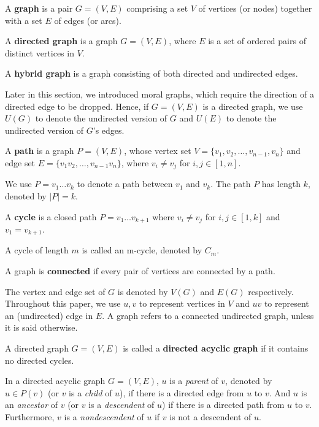 \begin{definition}
\label{def:graph}
A \textbf{graph} is a pair $G = (V, E)$ comprising a set $V$ of vertices (or nodes) together with a set $E$ of edges (or arcs).
\end{definition}

\begin{definition}
\label{def:digraph}
A \textbf{directed graph} is a graph $G=(V,E)$, where $E$ is a set of ordered pairs of distinct vertices in $V$.
\end{definition} 

\begin{definition}
\label{def:hybrid_g}
A \textbf{hybrid graph} is a graph consisting of both directed and undirected edges. 
\end{definition}
Later in this section, we introduced moral graphs, which require the direction of a directed edge to be dropped. Hence, if $G=(V,E)$ is a directed graph, we use $U(G)$ to denote the undirected version of $G$ and $U(E)$ to denote the undirected version of $G$'s edges. 

\begin{definition}
A \textbf{path} is a graph $P=(V,E)$, whose vertex set $V=\{v_1,v_2,\dots,v_{n-1},v_n\}$ and edge set $E=\{v_1v_2,\dots,v_{n-1}v_n\}$, where $v_i\neq v_j$ for $i,j \in [1,n]$.
\end{definition}
We use $P=v_1\dots v_k$ to denote a path between $v_1$ and $v_k$. The path $P$ has length $k$, denoted by $|P|=k$.

\begin{definition}
A \textbf{cycle} is a closed path $P=v_1\dots v_{k+1}$ where $v_i\neq v_j$ for $i,j \in [1,k]$ and $v_1=v_{k+1}$. 
\end{definition}
A cycle of length $m$ is called an m-cycle, denoted by $C_m$. 

\begin{definition}
A graph is \textbf{connected} if every pair of vertices are connected by a path. 
\end{definition}
The vertex and edge set of $G$ is denoted by $V(G)$ and $E(G)$ respectively. Throughout this paper, we use $u,v$ to represent vertices in $V$ and $uv$ to represent an (undirected) edge in $E$. A graph refers to a connected undirected graph, unless it is said otherwise. 

\begin{definition}
\label{def:dag}
A directed graph $G = (V, E)$ is called a \textbf{directed acyclic graph} if it contains no directed cycles. 
\end{definition}
In a directed acyclic graph $G=(V,E)$, $u$ is a \textit{parent} of $v$, denoted by $u \in P(v)$ (or $v$ is a \textit{child} of $u$), if there is a directed edge from $u$ to $v$. And $u$ is an \textit{ancestor} of $v$ (or $v$ is a \textit{descendent} of $u$) if there is a directed path from $u$ to $v$. Furthermore, $v$ is a \textit{nondescendent} of $u$ if $v$ is not a descendent of $u$.

